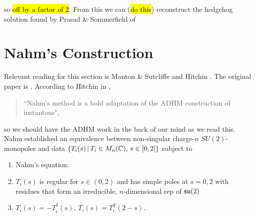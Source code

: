 \documentclass{article}
\begin{document}
\begin{example}
so 
\hl{off by a factor of 2}. From this we can (\hl{do this}) reconstruct the hedgehog solution found by Prasad \& Sommerfield of 
\end{example}


\section{Nahm's Construction}
Relevant reading for this section is Manton \& Sutcliffe \cite{Manton2004} and Hitchin \cite{Hitchin1983}. The original paper is \cite{Nahm1983}. According to Hitchin in \cite{Hitchin1983},
\begin{quote}
	``Nahm's method is a bold adaptation of the ADHM construction of instantons",
\end{quote}
so we should have the ADHM work in the back of our mind as we read this. Nahm established an equivalence between non-singular charge-$n$ $SU(2)$-monopoles and data $\left\{ T_i(s) \, | \, T_i \in M_n(\mathbb{C}), \, s \in [0,2] \right\}$ subject to 
\begin{enumerate}
	\item Nahm's equation:
	\item $T_i(s)$ is regular for $s \in (0,2)$ and has simple poles at $s=0,2$ with residues that form an irreducible, $n$-dimensional rep of $\mathfrak{su}(2)$
	\item $T_i(s) = -T_i^\dagger(s), \, T_i(s) = T^T_i(2-s)$. 
\end{enumerate}
\end{document}
